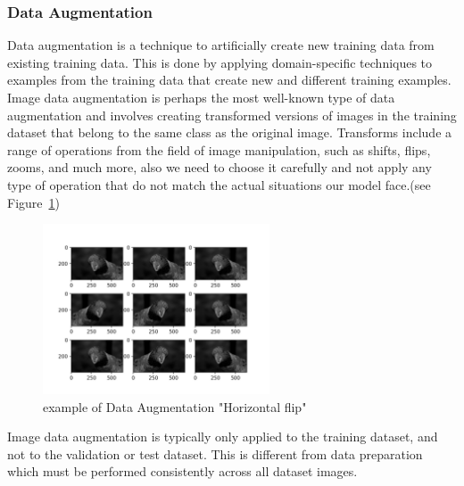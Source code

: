 \subsubsection{Data Augmentation}
Data augmentation is a technique to artificially create new training data from existing training data. This is done by applying domain-specific techniques to examples from the training data that create new and different training examples.\newline
Image data augmentation is perhaps the most well-known type of data augmentation and involves creating transformed versions of images in the training dataset that belong to the same class as the original image.\newline
Transforms include a range of operations from the field of image manipulation, such as shifts, flips, zooms, and much more, also we need to choose it carefully and not apply any type of operation that do not match the actual situations our model face.(see Figure~\ref{fig:data_augmentation})
\begin{figure}
	\centering
	\includegraphics[width=0.6\textwidth]{images/data_aug.jpg}
	\caption{example of Data Augmentation "Horizontal flip"}
	\label{fig:data_augmentation}
\end{figure} 
\newline
Image data augmentation is typically only applied to the training dataset, and not to the validation or test dataset. This is different from data preparation which must be performed consistently across all dataset images.




